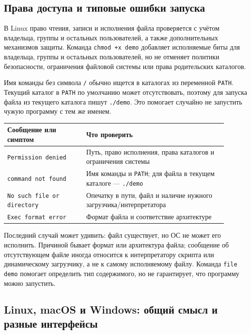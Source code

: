 \subsection{Права доступа и типовые ошибки запуска}

В Linux право чтения, записи и исполнения файла проверяется с учётом владельца,
группы и остальных пользователей, а также дополнительных механизмов защиты.
Команда \texttt{chmod +x demo} добавляет исполняемые биты для владельца,
группы и остальных пользователей, но не отменяет политики безопасности,
ограничения файловой системы или права родительских каталогов.

Имя команды без символа \texttt{/} обычно ищется в каталогах из переменной
\texttt{PATH}. Текущий каталог в \texttt{PATH} по умолчанию может отсутствовать,
поэтому для запуска файла из текущего каталога пишут \texttt{./demo}. Это
помогает случайно не запустить чужую программу с тем же именем.

\begin{center}
\small
\begin{tabular}{|p{0.32\linewidth}|p{0.58\linewidth}|}
\hline
Сообщение или симптом & Что проверить \\
\hline
\texttt{Permission denied} & Путь, право исполнения, права каталогов и ограничения системы \\
\texttt{command not found} & Имя команды и \texttt{PATH}; для файла в текущем каталоге --- \texttt{./demo} \\
\texttt{No such file or directory} & Опечатку в пути, файл и наличие нужного загрузчика/интерпретатора \\
\texttt{Exec format error} & Формат файла и соответствие архитектуре \\
\hline
\end{tabular}
\end{center}

Последний случай может удивить: файл существует, но ОС не может его исполнить.
Причиной бывает формат или архитектура файла; сообщение об отсутствующем файле
иногда относится к интерпретатору скрипта или динамическому загрузчику, а не
к самому исполняемому файлу. Команда \texttt{file demo} помогает определить
тип содержимого, но не гарантирует, что программу можно запустить.

\subsection{Linux, macOS и Windows: общий смысл и разные интерфейсы}

